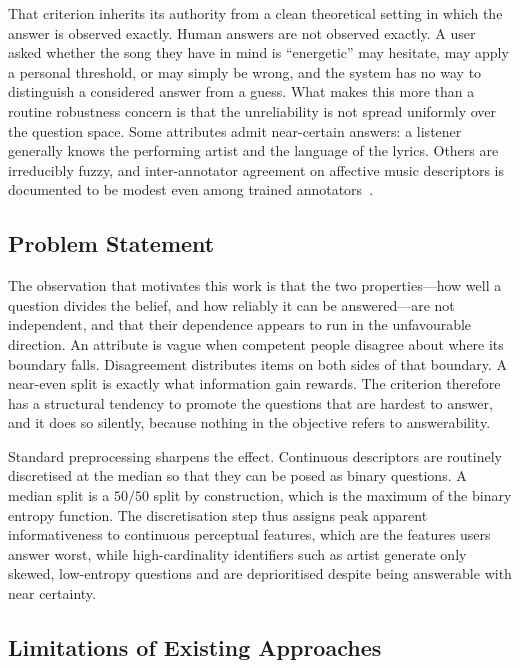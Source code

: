\documentclass[conference]{IEEEtran}
\begin{document}
That criterion inherits its authority from a clean theoretical setting in which
the answer is observed exactly. Human answers are not observed exactly. A user
asked whether the song they have in mind is ``energetic'' may hesitate, may
apply a personal threshold, or may simply be wrong, and the system has no way to
distinguish a considered answer from a guess. What makes this more than a
routine robustness concern is that the unreliability is not spread uniformly
over the question space. Some attributes admit near-certain answers: a listener
generally knows the performing artist and the language of the lyrics. Others
are irreducibly fuzzy, and inter-annotator agreement on affective music
descriptors is documented to be modest even among trained
annotators~\cite{hu2007mood,kim2010emotion}.

\subsection{Problem Statement}

The observation that motivates this work is that the two properties---how well
a question divides the belief, and how reliably it can be answered---are not
independent, and that their dependence appears to run in the unfavourable
direction. An attribute is vague when competent people disagree about where its
boundary falls. Disagreement distributes items on both sides of that boundary.
A near-even split is exactly what information gain rewards. The criterion
therefore has a structural tendency to promote the questions that are hardest
to answer, and it does so silently, because nothing in the objective refers to
answerability.

Standard preprocessing sharpens the effect. Continuous descriptors are
routinely discretised at the median so that they can be posed as binary
questions. A median split is a $50/50$ split by construction, which is the
maximum of the binary entropy function. The discretisation step thus assigns
peak apparent informativeness to continuous perceptual features, which are the
features users answer worst, while high-cardinality identifiers such as artist
generate only skewed, low-entropy questions and are deprioritised despite being
answerable with near certainty.

\subsection{Limitations of Existing Approaches}
\end{document}
